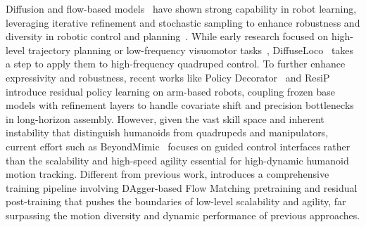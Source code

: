 Diffusion and flow-based models~\cite{song2020denoising, ho2020denoising, peebles2023scalable,rombach2022high,lipman2022flow,pan2025much,tessler2025maskedmanipulator,tessler2024maskedmimic,chi2023diffusion} have shown strong capability in robot learning, leveraging iterative refinement and stochastic sampling to enhance robustness and diversity in robotic control and planning~\cite{pan2025much}. While early research focused on high-level trajectory planning or low-frequency visuomotor tasks~\cite{janner2022planning,huang2023diffusion,chi2023diffusion,xian2023chaineddiffuser,black2023zero}, DiffuseLoco~\cite{huang2024diffuseloco} takes a step to apply them to high-frequency quadruped control. To further enhance expressivity and robustness, recent works like Policy Decorator~\cite{yuan2024policy} and ResiP~\cite{ankile2025imitation} introduce residual policy learning on arm-based robots, coupling frozen base models with refinement layers to handle covariate shift and precision bottlenecks in long-horizon assembly. However, given the vast skill space and inherent instability that distinguish humanoids from quadrupeds and manipulators, current effort such as BeyondMimic~\cite{liao2025beyondmimic} focuses on guided control interfaces rather than the scalability and high-speed agility essential for high-dynamic humanoid motion tracking. Different from previous work, \model introduces a comprehensive training pipeline involving DAgger-based Flow Matching pretraining and residual post-training that pushes the boundaries of low-level scalability and agility, far surpassing the motion diversity and dynamic performance of previous approaches. 




